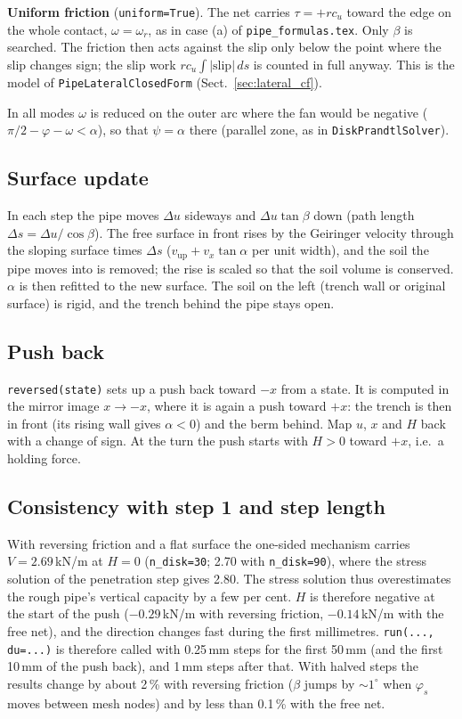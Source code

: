 \documentclass[11pt,a4paper]{article}
\begin{document}
\textbf{Uniform friction} (\texttt{uniform=True}).  The net carries
$\tau = +r c_u$ toward the edge on the whole contact,
$\omega = \omega_r$, as in case (a) of \texttt{pipe\_formulas.tex}.
Only $\beta$ is searched.  The friction then acts against the slip only
below the point where the slip changes sign; the slip work
$r c_u\int|\text{slip}|\,ds$ is counted in full anyway.  This is the
model of \texttt{PipeLateralClosedForm} (Sect.~\ref{sec:lateral_cf}).

In all modes $\omega$ is reduced on the outer arc where the fan would
be negative ($\pi/2 - \varphi - \omega < \alpha$), so that
$\psi = \alpha$ there (parallel zone, as in \texttt{DiskPrandtlSolver}).

\subsection{Surface update}

In each step the pipe moves $\Delta u$ sideways and
$\Delta u\tan\beta$ down (path length $\Delta s = \Delta u/\cos\beta$).
The free surface in front rises by the Geiringer velocity through the
sloping surface times $\Delta s$
($v_\text{up} + v_x\tan\alpha$ per unit width), and the soil the pipe
moves into is removed; the rise is scaled so that the soil volume is
conserved.  $\alpha$ is then refitted to the new surface.  The soil on
the left (trench wall or original surface) is rigid, and the trench
behind the pipe stays open.

\subsection{Push back}

\texttt{reversed(state)} sets up a push back toward $-x$ from a state.
It is computed in the mirror image $x \to -x$, where it is again a push
toward $+x$: the trench is then in front (its rising wall gives
$\alpha < 0$) and the berm behind.  Map $u$, $x$ and $H$ back with a
change of sign.  At the turn the push starts with $H > 0$ toward $+x$,
i.e.\ a holding force.

\subsection{Consistency with step 1 and step length}

With reversing friction and a flat surface the one-sided mechanism
carries $V = 2.69$\,kN/m at $H = 0$ (\texttt{n\_disk=30}; 2.70 with
\texttt{n\_disk=90}), where the stress solution of the penetration step
gives 2.80.  The stress solution thus overestimates the rough pipe's
vertical capacity by a few per cent.  $H$ is therefore negative at the
start of the push ($-0.29$\,kN/m with reversing friction,
$-0.14$\,kN/m with the free net), and the direction changes fast
during the first millimetres.
\texttt{run(..., du=...)} is therefore called with 0.25\,mm steps for
the first 50\,mm (and the first 10\,mm of the push back), and 1\,mm
steps after that.  With halved steps the results change by about 2\,\%
with reversing friction ($\beta$ jumps by $\sim1^\circ$ when
$\varphi_s$ moves between mesh nodes) and by less than 0.1\,\% with the
free net.
\end{document}
